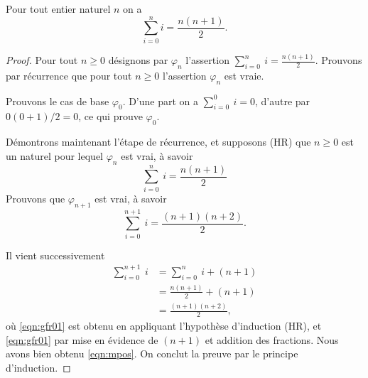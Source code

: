 \documentclass[french,course,oneside,theoremnosection]{lecture}
\begin{document}
\begin{proposition}
Pour tout entier naturel $n$ on a 
\[
\sum_{i=0}^n i =\frac{n(n+1)}{2}.
\]
\end{proposition}
\begin{proof}
Pour tout $n\geq 0$ désignons par $\varphi_n$ l'assertion ${\sum}_{i=0}^n\ i =\frac{n(n+1)}{2}$. Prouvons par récurrence que pour tout $n\geq 0$ l'assertion $\varphi_n$ est vraie.

Prouvons le cas de base $\varphi_0$. D'une part on a ${\sum}_{i=0}^0\ i =0$, d'autre par  ${0(0+1)}/{2}=0$, ce qui prouve $\varphi_0$.

Démontrons maintenant l'étape de récurrence, et supposons (HR) que $n\geq 0$ est un naturel pour lequel $\varphi_n$ est vrai, à savoir
\begin{equation}\label{eqn:mpos}
\sum_{i=0}^n\ i =\frac{n(n+1)}{2}\tag{HR}
\end{equation}
Prouvons que $\varphi_{n+1}$ est vrai, à savoir \[\sum_{i=0}^{n+1}\ i =\frac{(n+1)(n+2)}{2}.\]

Il vient successivement
\begin{align}
\sum_{i=0}^{n+1}\ i & = \sum_{i=0}^{n}\ i +(n+1)\\
 & = \frac{n(n+1)}{2}+(n+1)\label{eqn:gfr01}\\
 & = \frac{(n+1)(n+2)}{2}\label{eqn:gfr02},
\end{align}
où \eqref{eqn:gfr01} est obtenu en appliquant l’hypothèse d'induction (HR), et \eqref{eqn:gfr01} par mise en évidence de $(n+1)$ et addition des fractions. Nous avons bien obtenu \eqref{eqn:mpos}. On conclut la preuve par le principe d'induction.
\end{proof} 
\end{document}
